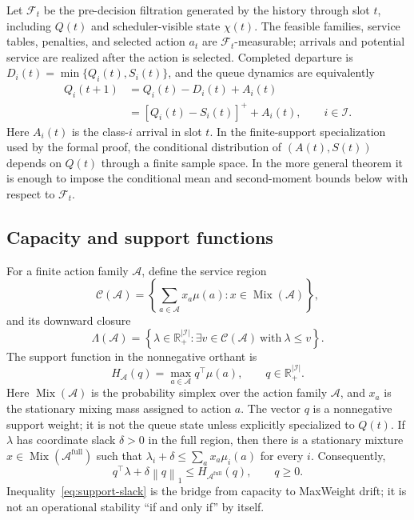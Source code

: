 \documentclass[opre,dblanonrev]{informs4}
\newcommand{\Afull}{\mathcal A^{\mathrm{full}}}
\newcommand{\Real}{\mathbb R}
\newcommand{\normone}[1]{\left\|#1\right\|_1}
\begin{document}
Let \(\mathcal F_t\) be the pre-decision filtration generated by the history
through slot \(t\), including \(Q(t)\) and scheduler-visible state \(\chi(t)\).
The feasible families, service tables, penalties, and selected action \(a_t\)
are \(\mathcal F_t\)-measurable; arrivals and potential service are realized
after the action is selected.  Completed departure is
\(D_i(t)=\min\{Q_i(t),S_i(t)\}\), and the queue dynamics are equivalently
\begin{equation}
  \begin{aligned}
  Q_i(t+1)
  &=Q_i(t)-D_i(t)+A_i(t)\\
  &=\left[Q_i(t)-S_i(t)\right]^+ + A_i(t),
  \qquad i\in\mathcal I.
  \end{aligned}
  \label{eq:queue-dynamics}
\end{equation}
Here \(A_i(t)\) is the class-\(i\) arrival in slot \(t\).  In the finite-support
specialization used by the formal proof, the conditional distribution of
\((A(t),S(t))\) depends on \(Q(t)\) through a finite sample space.  In the more
general theorem it is enough to impose the conditional mean and second-moment
bounds below with respect to \(\mathcal F_t\).

\subsection{Capacity and support functions}
\label{subsec:capacity-support}

For a finite action family \(\mathcal A\), define the service region
\begin{equation}
  \mathcal C(\mathcal A)
  =
  \left\{\sum_{a\in\mathcal A}x_a\mu(a):x\in\operatorname{Mix}(\mathcal A)\right\},
\end{equation}
and its downward closure
\begin{equation}
  \Lambda(\mathcal A)
  =
  \left\{ \lambda\in\Real_+^{|\mathcal I|}:
    \exists v\in\mathcal C(\mathcal A)\ \text{with}\ \lambda\le v
  \right\}.
\end{equation}
The support function in the nonnegative orthant is
\begin{equation}
  H_{\mathcal A}(q)=\max_{a\in\mathcal A}q^\top \mu(a),
  \qquad q\in\Real_+^{|\mathcal I|}.
\end{equation}
Here \(\operatorname{Mix}(\mathcal A)\) is the probability simplex over the action family
\(\mathcal A\), and \(x_a\) is the stationary mixing mass assigned to action
\(a\).  The vector \(q\) is a nonnegative support weight; it is not the queue
state unless explicitly specialized to \(Q(t)\).
If \(\lambda\) has coordinate slack \(\delta>0\) in the full region, then there
is a stationary mixture \(x\in\operatorname{Mix}(\Afull)\) such that
\(\lambda_i+\delta\le \sum_a x_a\mu_i(a)\) for every \(i\).  Consequently,
\begin{equation}
  q^\top\lambda+\delta\normone{q}\le H_{\Afull}(q),
  \qquad q\ge0.
  \label{eq:support-slack}
\end{equation}
Inequality~\eqref{eq:support-slack} is the bridge from capacity to MaxWeight
drift; it is not an operational stability ``if and only if'' by itself.
\end{document}
